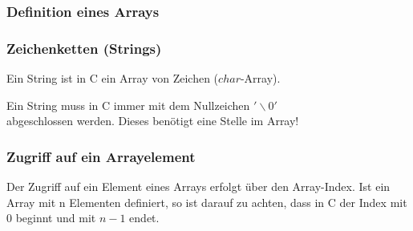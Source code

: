 		\begin{minipage}[t]{10.5 cm}
			\subsubsection{Definition eines Arrays }
				\vspace*{-0.3cm}
				
			\subsubsection{Zeichenketten (Strings) }
				\begin{compactitem}
					\item Ein String ist in C ein Array von Zeichen ($char$-Array).
					\item Ein String muss in C immer mit dem Nullzeichen $'\backslash0'$ \\
					abgeschlossen werden. Dieses benötigt eine Stelle im Array!					
				\end{compactitem}
				
		\end{minipage}	
		\begin{minipage}[t]{8.5 cm}
			\subsubsection{Zugriff auf ein Arrayelement }
				Der Zugriff auf ein Element eines Arrays erfolgt über den Array-Index. Ist ein Array mit n Elementen definiert, so ist darauf zu achten, dass in C der Index mit $0$ beginnt und mit $n-1$ endet.
				
		\end{minipage}	

